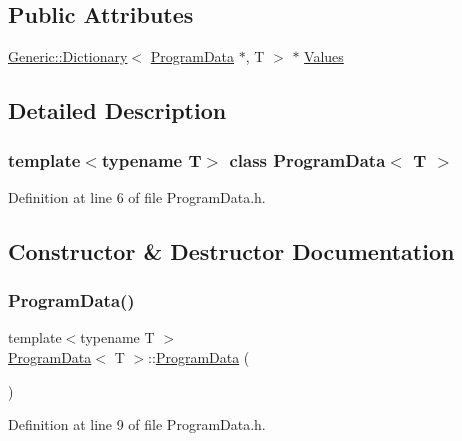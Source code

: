 \subsection*{Public Attributes}
\begin{DoxyCompactItemize}
\item 
\mbox{\hyperlink{classGeneric_1_1Dictionary}{Generic\+::\+Dictionary}}$<$ \mbox{\hyperlink{classProgramData}{Program\+Data}} $\ast$, T $>$ $\ast$ \mbox{\hyperlink{classProgramData_a1dea8570e013c06776692b248f25a534}{Values}}
\end{DoxyCompactItemize}


\subsection{Detailed Description}
\subsubsection*{template$<$typename T$>$\newline
class Program\+Data$<$ T $>$}



Definition at line 6 of file Program\+Data.\+h.



\subsection{Constructor \& Destructor Documentation}
\mbox{\label{classProgramData_ac1c5a21a44f037b1c5448378fdbaabd0}} 
\subsubsection{\texorpdfstring{Program\+Data()}{ProgramData()}}
{\footnotesize\ttfamily template$<$typename T $>$ \\
\mbox{\hyperlink{classProgramData}{Program\+Data}}$<$ T $>$\+::\mbox{\hyperlink{classProgramData}{Program\+Data}} (\begin{DoxyParamCaption}{ }\end{DoxyParamCaption})\hspace{0.3cm}{\ttfamily [inline]}}



Definition at line 9 of file Program\+Data.\+h.



